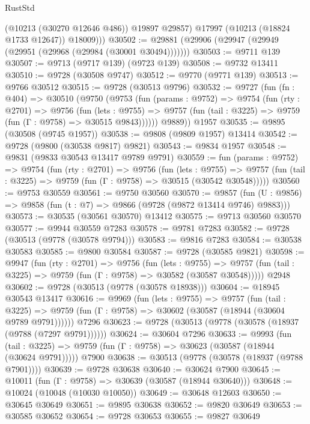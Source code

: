 \begin{lexlean}{RustStd}
\begin{coremodule}
{\begin{coremodule}
{{{{{{{{{{{{{{{{{{{{{{{{{{            (@10213 (@30270 @12646 @486))
            @19897
            @29857)
          @17997
          (@10213 (@18824 @1733 @12647))
          @18009)))
@30502 := @29881 (@29906 (@29947 (@29949 (@29951 (@29968 (@29984 (@30001 @30494)))))))
@30503 := @9711 @139
@30507 := @9713 (@9717 @139) (@9723 @139)
@30508 := @9732 @13411
@30510 := @9728 (@30508 @9747)
@30512 := @9770 (@9771 @139)
@30513 := @9766 @30512
@30515 := @9728 (@30513 @9796)
@30532 := @9727
    (fun (fn : @404) =>
    @30510
      (@9750
        (@9753
          (fun (params : @9752) =>
          @9754
            (fun (rty : @2701) =>
            @9756
              (fun (lets : @9755) =>
              @9757 (fun (tail : @3225) => @9759 (fun (Γ : @9758) => @30515 @9843))))))
        @9889))
    @1957
@30535 := @9895 (@30508 (@9745 @1957))
@30538 := @9808 (@9809 @1957) @13414
@30542 := @9728 (@9800 (@30538 @9817) @9821)
@30543 := @9834 @1957
@30548 := @9831 (@9833 @30543 @13417 @9789 @9791)
@30559 := fun (params : @9752) =>
  @9754
    (fun (rty : @2701) =>
    @9756
      (fun (lets : @9755) =>
      @9757 (fun (tail : @3225) => @9759 (fun (Γ : @9758) => @30515 (@30542 @30548)))))
@30560 := @9753 @30559
@30561 := @9750 @30560
@30570 := @9857
    (fun (U : @9856) => @9858 (fun (t : @7) => @9866 (@9728 (@9872 @13414 @9746) @9883)))
@30573 := @30535 (@30561 @30570) @13412
@30575 := @9713 @30560 @30570
@30577 := @9944 @30559 @7283
@30578 := @9781 @7283
@30582 := @9728 (@30513 (@9778 (@30578 @9794)))
@30583 := @9816 @7283
@30584 := @30538 @30583
@30585 := @9800 @30584
@30587 := @9728 (@30585 @9821)
@30598 := @9947
    (fun (rty : @2701) =>
    @9756
      (fun (lets : @9755) =>
      @9757 (fun (tail : @3225) => @9759 (fun (Γ : @9758) => @30582 (@30587 @30548)))))
    @2948
@30602 := @9728 (@30513 (@9778 (@30578 @18938)))
@30604 := @18945 @30543 @13417
@30616 := @9969
    (fun (lets : @9755) =>
    @9757
      (fun (tail : @3225) =>
      @9759 (fun (Γ : @9758) => @30602 (@30587 (@18944 (@30604 @9789 @9791))))))
    @7296
@30623 := @9728 (@30513 (@9778 (@30578 (@18937 (@9788 (@7297 @9791))))))
@30624 := @30604 @7296
@30633 := @9993
    (fun (tail : @3225) => @9759 (fun (Γ : @9758) => @30623 (@30587 (@18944 (@30624 @9791)))))
    @7900
@30638 := @30513 (@9778 (@30578 (@18937 (@9788 @7901))))
@30639 := @9728 @30638
@30640 := @30624 @7900
@30645 := @10011 (fun (Γ : @9758) => @30639 (@30587 (@18944 @30640)))
@30648 := @10024 (@10048 (@10030 @10050))
@30649 := @30648 @12603
@30650 := @30645 @30649
@30651 := @9895 @30638
@30652 := @9820 @30649
@30653 := @30585 @30652
@30654 := @9728 @30653
@30655 := @9827 @30649
}}}}}}}}}}}}}}}}}}}}}}}}}}
\end{coremodule}}
\end{coremodule}
\end{lexlean}
